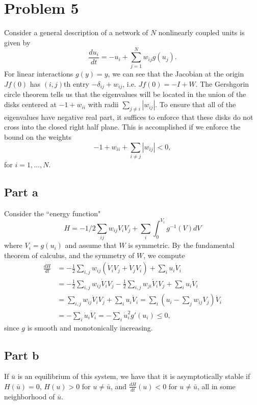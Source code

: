 \documentclass{article}
\begin{document}
\section{Problem 5}
Consider a general description of a network of $N$ nonlinearly coupled units is given by
\[
\frac {d u_i}{dt} = -u_i + \sum_{j=1}^N w_{ij} g(u_j).
\]
For linear interactions $g(y)=y$, we can see that the Jacobian at the origin $Jf(0)$ has $(i,j)$th entry $-\delta_{ij}+w_{ij}$, i.e. $Jf(0)=-I+W$. The Gershgorin circle theorem tells us that the eigenvalues will be located in the union of the disks centered at $-1+w_{ii}$ with radii $\sum_{j\neq i}|w_{ij}|$. To ensure that all of the eigenvalues have negative real part, it suffices to enforce that these disks do not cross into the closed right half plane. This is accomplished if we enforce the bound on the weights
\[
-1+w_{ii}+\sum_{i\neq j}|w_{ij}|<0,
\]
for $i=1,\ldots,N$.

\subsection{Part a}
Consider the ``energy function" \[ H=-1/2 \sum_{ij} w_{ij} V_i V_j + \sum_i \int_0^{V_i} g^{-1}(V) dV \]
where $V_i=g(u_i)$ and assume that $W$ is symmetric. By the fundamental theorem of calculus, and the symmetry of $W$, we compute
\begin{align*}
\frac{dH}{dt}&=-\frac{1}{2}\sum_{i,j}w_{ij}\left(\dot V_iV_j+\dot V_jV_i\right)+\sum_iu_i\dot V_i\\&=
-\frac{1}{2}\sum_{i,j}w_{ij}\dot V_iV_j-\frac{1}{2}\sum_{i,j}w_{ji}\dot V_iV_j+\sum_iu_i\dot V_i\\&=
\sum_{i,j}w_{ij}\dot V_iV_j+\sum_iu_i\dot V_i=\sum_i\left(u_i-\sum_jw_{ij}V_j\right)\dot V_i\\&=
-\sum_i\dot u_i\dot V_i=-\sum_i\dot u_i^2g'(u_i)\leq0,
\end{align*}
since $g$ is smooth and monotonically increasing.
\subsection{Part b}
If $\bar u$ is an equilibrium of this system, we have that it is asymptotically stable if $H(\bar u)=0$, $H(u)>0$ for $u\neq \bar u$, and $\frac{dH}{dt}(u)<0$ for $u\neq\bar u$, all in some neighborhood of $\bar u$.
\end{document}
